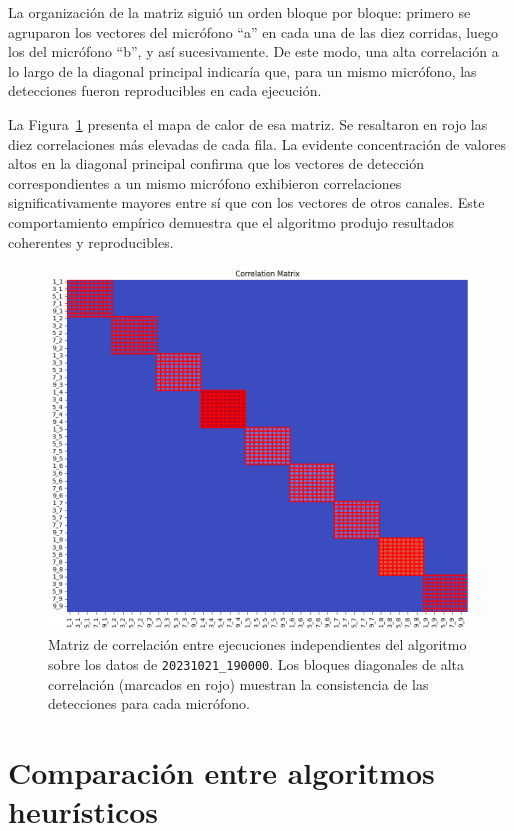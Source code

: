 La organización de la matriz siguió un orden bloque por bloque: 
primero se agruparon los vectores del micrófono “a” en cada una 
de las diez corridas, luego los del micrófono “b”, y así 
sucesivamente. De este modo, una alta correlación a lo largo de 
la diagonal principal indicaría que, para un mismo micrófono, 
las detecciones fueron reproducibles en cada ejecución.

La Figura~\ref{fig:correlation} presenta el mapa de calor de esa 
matriz. Se resaltaron en rojo las diez correlaciones más 
elevadas de cada fila. La evidente concentración de valores 
altos en la diagonal principal confirma que los vectores de 
detección correspondientes a un mismo micrófono exhibieron 
correlaciones significativamente mayores entre sí que con los 
vectores de otros canales. Este comportamiento empírico 
demuestra que el algoritmo produjo resultados coherentes y 
reproducibles.

\begin{figure}[ht]
    \centering
    \includegraphics[width=0.7\linewidth]{Graphics/correlation_matrix.png}
    \caption{Matriz de correlación entre ejecuciones independientes del algoritmo sobre los datos de \texttt{20231021\_190000}. Los bloques diagonales de alta correlación (marcados en rojo) muestran la consistencia de las detecciones para cada micrófono.}
    \label{fig:correlation}
\end{figure}


\section{Comparación entre algoritmos heurísticos}
\label{sec:res_comparacion}


